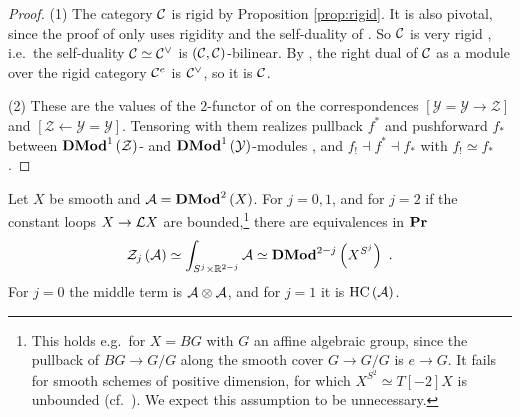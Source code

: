 \begin{proof}
(1) The category $\mathcal{C}$ is rigid by Proposition \ref{prop:rigid}. It is also pivotal, since the
proof of \cite[Lemma 3.5.4]{Ber:center} only uses rigidity and the self-duality of
\cite[Proposition 3.2.4]{Ber:center}. So $\mathcal{C}$ is very rigid \cite[Section 5.1.4]{Ber:center},
i.e.\ the self-duality $\mathcal{C}\simeq\mathcal{C}^\vee$ is $\left(\mathcal{C},\mathcal{C}\right)$-bilinear.
By \cite[Corollary 2.1.7]{Ber:ShvCatH}, the right dual of $\mathcal{C}$ as a module over the rigid
category $\mathcal{C}^e$ is $\mathcal{C}^\vee$, so it is $\mathcal{C}$.

(2) These are the values of the $2$-functor of \cite[Theorem 6.5.3]{Ber:ShvCatH} on the correspondences
$\left[\mathcal{Y}=\mathcal{Y}\to\mathcal{Z}\right]$ and $\left[\mathcal{Z}\leftarrow\mathcal{Y}=\mathcal{Y}\right]$.
Tensoring with them realizes pullback $f^*$ and pushforward $f_*$ between
$\mathbf{DMod}^1\left(\mathcal{Z}\right)$- and $\mathbf{DMod}^1\left(\mathcal{Y}\right)$-modules
\cite[Corollary 6.5.4]{Ber:ShvCatH}, and $f_!\dashv f^*\dashv f_*$ with
$f_!\simeq f_*$ \cite[Corollary 6.5.5]{Ber:ShvCatH}.
\end{proof}

\begin{theorem}
\label{thm:centers}
Let $X$ be smooth and $\mathcal{A} = \mathbf{DMod}^2\left(X\right)$. For $j=0,1$, and for $j=2$ if the constant
loops $X\to\mathcal{L} X$ are bounded,\footnote{This holds e.g.\ for $X=BG$ with $G$ an affine algebraic
group, since the pullback of $BG\to G/G$ along the smooth cover $G\to G/G$ is $e\to G$. It fails
for smooth schemes of positive dimension, for which $X^{S^2}\simeq T\left[-2\right]X$ is unbounded
(cf.\ \cite[Section 1.3.13]{HoLi}). We expect this assumption to be unnecessary.}
there are equivalences in $\mathbf{Pr}$
\begin{equation*}
\mathcal{Z}_j\left(\mathcal{A}\right)\simeq\int_{S^j\times\mathbb{R}^{2-j}}\mathcal{A}\simeq\mathbf{DMod}^{2-j}\left(X^{S^j}\right) \ .
\end{equation*}
For $j=0$ the middle term is $\mathcal{A}\otimes\mathcal{A}$, and for $j=1$ it is $\operatorname{HC}\left(\mathcal{A}\right)$.
\end{theorem}

